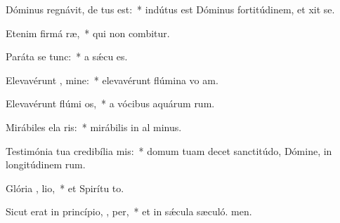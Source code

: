 \item Dóminus regnávit, de tus est:~* indútus est Dóminus fortitúdinem, et xit se.
\item Etenim firmá  ræ,~* qui non combitur.
\item Paráta se   tunc:~* a sǽcu  es.
\item Elevavérunt , mine:~* elevavérunt flúmina vo am.
\item Elevavérunt flúmi  os,~* a vócibus aquárum rum.
\item Mirábiles ela ris:~* mirábilis in al minus.
\item Testimónia tua credibília   mis:~* domum tuam decet sanctitúdo, Dómine, in longitúdinem rum.
\item Glória ,  lio,~* et Spirítu to.
\item Sicut erat in princípio,  ,  per,~* et in sǽcula sæculó. men.
